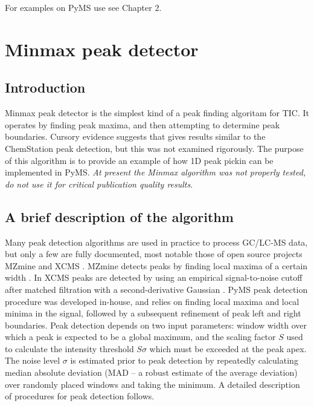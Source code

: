 For examples on PyMS use see Chapter 2.

\section{Minmax peak detector}

\subsection{Introduction}

Minmax peak detector is the simplest kind of a peak finding algoritam for
TIC. It operates by finding peak maxima, and then attempting to determine
peak boundaries. Cursory evidence suggests that gives results similar to
the ChemStation peak detection, but this was not examined rigorously.
The purpose of this algorithm is to provide an example of how 1D peak
pickin can be implemented in PyMS. {\em At present the Minmax algorithm
was not properly tested, do not use it for critical publication quality
results}.

\subsection{A brief description of the algorithm}

Many peak detection algorithms are used in practice to process GC/LC-MS data,
but only a few are fully documented, most notable those of open source
projects MZmine \cite{katajamaa06} and XCMS \cite{smith06}.  MZmine detects
peaks by finding local maxima of a certain width \cite{katajamaa06}. In XCMS
peaks are detected by using an empirical signal-to-noise cutoff after matched
filtration with a second-derivative Gaussian \cite{smith06}. PyMS peak
detection procedure was developed in-house, and relies on finding local
maxima and local minima in the signal, followed by a subsequent refinement
of peak left and right boundaries. Peak detection depends on two input
parameters: window width over which a peak is expected to be a global maximum,
and the scaling factor $S$ used to calculate the intensity threshold $S
\sigma$ which must be exceeded at the peak apex. The noise level $\sigma$
is estimated prior to peak detection by repeatedly calculating median
absolute deviation (MAD -- a robust estimate of the average deviation) over
randomly placed windows and taking the minimum. A detailed description of
procedures for peak detection follows. 

